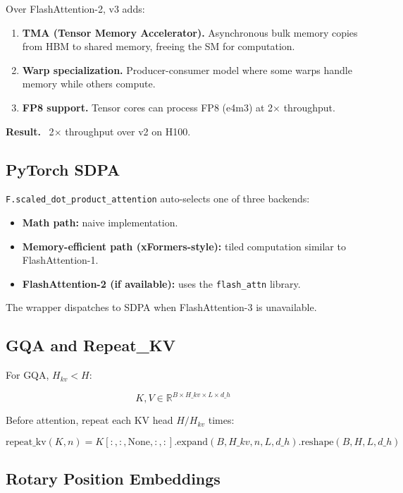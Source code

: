 Over FlashAttention-2, v3 adds:

\begin{enumerate}
\item \textbf{TMA (Tensor Memory Accelerator).} Asynchronous bulk memory copies
  from HBM to shared memory, freeing the SM for computation.
\item \textbf{Warp specialization.} Producer-consumer model where some warps handle
  memory while others compute.
\item \textbf{FP8 support.} Tensor cores can process FP8 (e4m3) at 2$\times$ throughput.

\end{enumerate}
\textbf{Result.} ~2$\times$ throughput over v2 on H100.

\subsection{PyTorch SDPA}

\texttt{F.scaled\_dot\_product\_attention} auto-selects one of three backends:

\begin{itemize}
\item \textbf{Math path:} naive implementation.
\item \textbf{Memory-efficient path (xFormers-style):} tiled computation similar
  to FlashAttention-1.
\item \textbf{FlashAttention-2 (if available):} uses the \texttt{flash\_attn} library.

\end{itemize}
The wrapper dispatches to SDPA when FlashAttention-3 is unavailable.

\subsection{GQA and Repeat\_KV}

For GQA, $H_{kv} < H$:

\[
K, V \in \mathbb{R}^{B \times H\_{kv} \times L \times d\_h}
\tag{3.6}
\]

Before attention, repeat each KV head $H/H_{kv}$ times:

\[
\text{repeat\_kv}(K, n) = K[:, :, \text{None}, :, :].\text{expand}(B, H\_{kv}, n, L, d\_h).\text{reshape}(B, H, L, d\_h)
\tag{3.7}
\]

\subsection{Rotary Position Embeddings}

